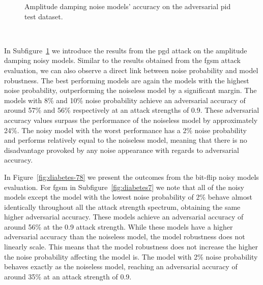 \begin{figure}[!h]
\begin{subfigure}{0.45\textwidth}
      \label{fig:diabetes6}
  \end{subfigure}
  \caption{Amplitude damping noise models' accuracy on the adversarial \ac{pid} test dataset.}
  \label{fig:diabetes-56}
\end{figure} \

In Subfigure~\ref{fig:diabetes6} we introduce the results from the \ac{pgd}
attack on the amplitude damping noisy models. Similar to the results
obtained from the \ac{fgsm} attack evaluation, we can also observe
a direct link between noise probability and model robustness.
The best performing models are again the models with the highest noise
probability, outperforming the noiseless model by a significant margin.
The models with 8\% and 10\% noise probability achieve an adversarial
accuracy of around 57\% and 56\% respectively at an attack strengths of
0.9. These adversarial accuracy values surpass the performance of
the noiseless model by approximately 24\%. The noisy model with the
worst performance has a 2\% noise probability and performs relatively
equal to the noiseless model, meaning that there is no disadvantage
provoked by any noise appearance with regards to adversarial accuracy. \

In Figure~\ref{fig:diabetes-78} we present the outcomes from the bit-flip
noisy models evaluation. For \ac{fgsm} in Subfigure~\ref{fig:diabetes7}
we note that all of the noisy models except the model with the lowest
noise probability of 2\% behave almost identically throughout all the
attack strength spectrum, obtaining the same higher adversarial
accuracy. These models achieve an adversarial accuracy of around 56\% at
the 0.9 attack strength. While these models have a higher adversarial
accuracy than the noiseless model, the model robustness does not linearly
scale. This means that the model robustness does not increase the
higher the noise probability affecting the model is. The model with
2\% noise probability behaves exactly as the noiseless model, reaching
an adversarial accuracy of around 35\% at an attack strength of 0.9. \

